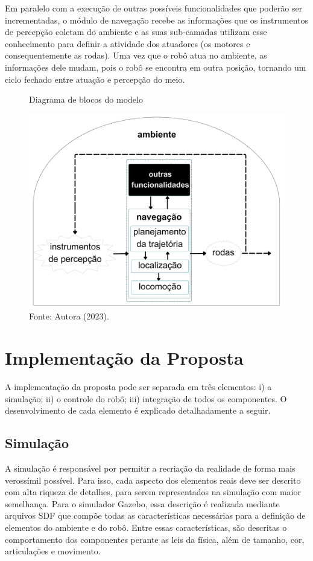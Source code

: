 Em paralelo com a execução de outras possíveis funcionalidades que poderão ser incrementadas, o módulo de navegação recebe as informações que os instrumentos de percepção coletam do ambiente e as suas sub-camadas utilizam esse conhecimento para definir a atividade dos atuadores (os motores e consequentemente as rodas). Uma vez que o robô atua no ambiente, as informações dele mudam, pois o robô se encontra em outra posição, tornando um ciclo fechado entre atuação e percepção do meio.

\begin{figure}[h]
    \centering
    \caption{Diagrama de blocos do modelo}
    \includegraphics[scale=0.08]{blocos.png}
   
    \caption*{Fonte: Autora (2023).}
    \label{fig:blocos}
\end{figure}


\section{Implementação da Proposta}
A implementação da proposta pode ser separada em três elementos: i) a simulação; ii) o controle do robô; iii) integração de todos os componentes. O desenvolvimento de cada elemento é explicado detalhadamente a seguir.

\subsection{Simulação}
A simulação é responsável por permitir a recriação da realidade de forma mais verossímil possível. Para isso, cada aspecto dos elementos reais deve ser descrito com alta riqueza de detalhes, para serem representados na simulação com maior semelhança. Para o simulador Gazebo, essa descrição é realizada mediante arquivos SDF que compõe todas as características necessárias para a definição de elementos do ambiente e do robô. Entre essas características, são descritas o comportamento dos componentes perante as leis da física, além de tamanho, cor, articulações e movimento.

